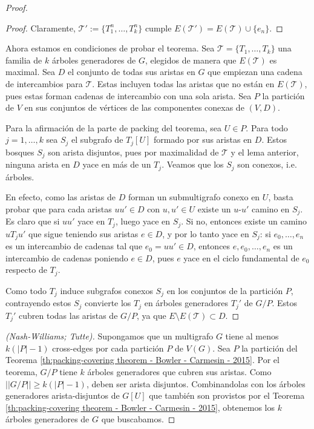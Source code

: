 \documentclass[12pt]{report}
\theoremstyle{plain}
\theoremstyle{definition}
\newcommand{\abs}[1]{\left \vert #1 \right \vert}
\newcommand{\Abs}[1]{\left \vert \left \vert #1 \right \vert \right \vert}
\begin{document}
\begin{proof}
\begin{proof}
Claramente, $\mathcal T ' := \{ T_1^n , \ldots, T_k^n \}$ cumple $E(\mathcal T ') = E(\mathcal T) \cup \{e_n\}$.
\end{proof}

Ahora estamos en condiciones de probar el teorema. Sea $\mathcal T =   \{T_1,\ldots, T_k\}$ una familia de $k$ árboles generadores de $G$, elegidos de manera que $E(\mathcal T)$ es maximal. Sea $D$ el conjunto de todas sus aristas en $G$ que empiezan una cadena de intercambios para $\mathcal T$. Estas incluyen todas las aristas que no están en $E(\mathcal T)$, pues estas forman cadenas de intercambio con una sola arista. Sea $P$ la partición de $V$ en sus conjuntos de vértices de las componentes conexas de $(V,D)$.

Para la afirmación de la parte de packing del teorema, sea $U \in P$. Para todo $j = 1, \ldots, k$ sea $S_j$ el subgrafo de $T_j [U]$ formado por sus aristas en $D$. Estos bosques $S_j$ son arista disjuntos, pues por maximalidad de $\mathcal T$ y el lema anterior, ninguna arista en $D$ yace en más de un $T_j$. Veamos que los $S_j$ son conexos, i.e. árboles.

En efecto, como las aristas de $D$ forman un submultigrafo conexo en $U$, basta probar que para cada aristas $uu'\in D$ con $u,u' \in U$ existe un $u$-$u'$ camino en $S_j$. Es claro que si $uu'$ yace en $T_j$, luego yace en $S_j$. Si no, entonces existe un camino $uT_j u'$ que sigue teniendo sus aristas $e \in D$, y por lo tanto yace en $S_j$: si $e_0, \ldots, e_n$ es un intercambio de cadenas tal que $e_0 = uu' \in D$, entonces $e, e_0, \ldots, e_n$ es un intercambio de cadenas poniendo $e \in D$, pues $e$ yace en el ciclo fundamental de $e_0$ respecto de $T_j$.

Como todo $T_j$ induce subgrafos conexos $S_j$ en los conjuntos de la partición $P$, contrayendo estos $S_j$ convierte los $T_j$ en árboles generadores $T_j'$ de $G/P$. Estos $T_j'$ cubren todas las aristas de $G/P$, ya que $E \setminus E(\mathcal T) \subset D$.

\end{proof}

\begin{proof}[(Nash-Williams; Tutte)]
Supongamos que un multigrafo $G$ tiene al menos $k (\abs P -1)$ cross-edges por cada partición $P$ de $V(G)$. Sea $P$ la partición del Teorema \ref{th:packing-covering theorem - Bowler - Carmesin - 2015}. Por el teorema, $G/P$ tiene $k$ árboles generadores que cubren sus aristas. Como $\Abs {G/P} \geq k(\abs P -1)$, deben ser arista disjuntos. Combinandolas con los árboles generadores arista-disjuntos de $G[U]$ que también son provistos por el Teorema \ref{th:packing-covering theorem - Bowler - Carmesin - 2015}, obtenemos los $k$ árboles generadores de $G$ que buscabamos.
\end{proof}
\end{document}
